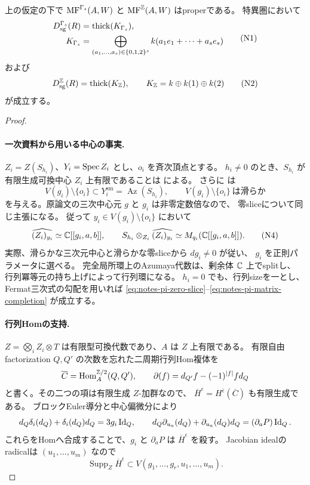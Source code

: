 \begin{proposition}[PIの場合のpropernessと残余体生成]
\label{prop:notes-pi-residue-generator}
上の仮定の下で \(\operatorname{MF}^{\Gamma_s}(A,W)\) と \(\operatorname{MF}^\mathbb Z(A,W)\) はproperである。
特異圏において
\[
 \begin{aligned}
 D_{\mathrm{sg}}^{\Gamma_s}(R)&=\operatorname{thick}(K_{\Gamma_s}),\\
 K_{\Gamma_s}&=
 \bigoplus_{(a_1,\ldots,a_s)\in\{0,1,2\}^s}
 k(a_1e_1+\cdots+a_se_s)
 \end{aligned}
 \tag{N1}\label{eq:notes-pi-gamma-generator}
\]
および
\[
 D_{\mathrm{sg}}^\mathbb Z(R)=\operatorname{thick}(K_{\mathbb Z}),\qquad
 K_{\mathbb Z}=k\oplus k(1)\oplus k(2)
 \tag{N2}\label{eq:notes-pi-z-generator}
\]
が成立する。
\end{proposition}

\begin{proof}
\paragraph{一次資料から用いる中心の事実.}
\(Z_i=Z(S_{h_i})\)、\(Y_i=\operatorname{Spec} Z_i\) とし、\(o_i\) を斉次頂点とする。
\(h_i\ne0\) のとき、\(S_{h_i}\) が有限生成可換中心 \(Z_i\) 上有限であることは
\cite[Theorem 3.7(c), p.~38]{SmithTate} による。
さらに \cite[Theorem 1.3(1),(2a)]{WWY3} は
\[
 V(g_i)\setminus\{o_i\}\subset Y_i^{\mathrm{sm}}
       =\operatorname{Az}(S_{h_i}),\qquad
 V(g_i)\setminus\{o_i\}\ \text{は滑らか}
 \tag{N3}\label{eq:notes-pi-zero-slice}
\]
を与える。原論文の三次中心元 \(g\) と \(g_i\) は非零定数倍なので、
零sliceについて同じ主張になる。
従って \(y_i\in V(g_i)\setminus\{o_i\}\) において
\[
 \widehat{(Z_i)_{y_i}}\simeq\mathbb C[[g_i,a,b]],\qquad
 S_{h_i}\otimes_{Z_i}\widehat{(Z_i)_{y_i}}
       \simeq M_{q_i}(\mathbb C[[g_i,a,b]]).
 \tag{N4}\label{eq:notes-pi-matrix-completion}
\]
実際、滑らかな三次元中心と滑らかな零sliceから \(dg_i\ne0\) が従い、
\(g_i\) を正則パラメータに選べる。
完全局所環上のAzumaya代数は、剰余体 \(\mathbb C\) 上でsplitし、
行列冪等元の持ち上げによって行列環になる。
\(h_i=0\) でも、行列sizeを一とし、Fermat三次式の勾配を用いれば
\eqref{eq:notes-pi-zero-slice}--\eqref{eq:notes-pi-matrix-completion} が成立する。

\paragraph{行列Homの支持.}
\(Z=\bigotimes_i Z_i\otimes T\) は有限型可換代数であり、\(A\) は \(Z\) 上有限である。
有限自由factorization \(Q,Q'\) の次数を忘れた二周期行列Hom複体を
\[
 \overline C=\operatorname{Hom}_A^{\mathbb Z/2}(Q,Q'),\qquad
 \partial(f)=d_{Q'}f-(-1)^{|f|}fd_Q
\]
と書く。その二つの項は有限生成 \(Z\)-加群なので、
\(\overline H^\epsilon=H^{\bar\epsilon}(\overline C)\) も有限生成である。
ブロックEuler導分と中心偏微分により
\[
 d_Q\delta_i(d_Q)+\delta_i(d_Q)d_Q=3g_i\operatorname{Id}_Q,\qquad
 d_Q\partial_{u_a}(d_Q)+\partial_{u_a}(d_Q)d_Q
       =(\partial_aP)\operatorname{Id}_Q.
\]
これらをHomへ合成することで、\(g_i\) と \(\partial_aP\) は
\(\overline H^\epsilon\) を殺す。
Jacobian idealのradicalは \((u_1,\ldots,u_m)\) なので
\[
 \operatorname{Supp}_Z\overline H^\epsilon
 \subset V(g_1,\ldots,g_r,u_1,\ldots,u_m).
 \tag{N5}\label{eq:notes-pi-support}
\]


\end{proof}
